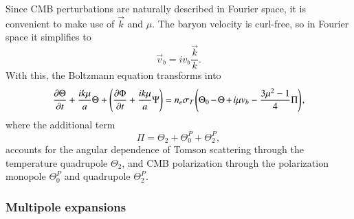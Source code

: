 \documentclass{aa}
\numberwithin{equation}{section}
\numberwithin{table}{section}
\numberwithin{figure}{section}
\begin{document}
Since CMB perturbations are naturally described in Fourier space, it is convenient to make use of $\vec{k}$ and $\mu$. The baryon velocity is curl-free, so in Fourier space it simplifies to 
\begin{equation} 
  \vec{v}_b = iv_b \frac{\vec{k}}{k}. 
\end{equation} 
With this, the Boltzmann equation transforms into
\begin{equation} 
  \frac{\partial \Theta}{\partial t} + \frac{ik\mu}{a} \Theta + \left(\frac{\partial\Phi}{\partial t} + \frac{ik\mu}{a} \Psi \right) = n_e\sigma_T \hspace{-1pt}\left(\Theta_0 \hspace{-1pt}-\hspace{-1pt} \Theta \hspace{-1pt}+ \hspace{-1pt}i\mu v_b - \frac{3\mu^2 - 1}{4} \Pi \right)\hspace{-1pt}, \label{eq: Boltzmann photons Fourier}
\end{equation} 
where the additional term 
\begin{equation}
  \Pi = \Theta_2 + \Theta_0^P + \Theta_2^P, \label{eq: Pi}
\end{equation}
accounts for the angular dependence of Tomson scattering through the temperature quadrupole $\Theta_2$, and CMB polarization through the polarization monopole $\Theta_0^P$ and quadrupole $\Theta_2^P$.


\subsubsection{Multipole expansions}
\end{document}
